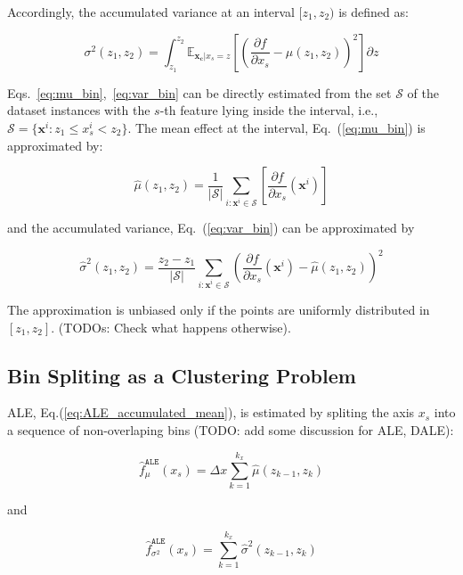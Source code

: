 \documentclass[twoside]{article}
\newcommand{\dfdx}{\frac{\partial f}{\partial x_s}}
\newcommand{\xc}{\mathbf{x_c}}
\begin{document}
\noindent
Accordingly, the accumulated variance at an interval \([z_1, z_2)\)
is defined as:

\begin{equation}
  \label{eq:var_bin}
  \sigma^2(z_1, z_2) = \int_{z_1}^{z_2}
  \mathbb{E}_{\xc|x_s=z} \left [ (\frac{\partial
      f}{\partial x_s} - \mu(z_1, z_2) )^2 \right] \partial z
\end{equation}

Eqs.~\eqref{eq:mu_bin},~\eqref{eq:var_bin} can be directly estimated
from the set \(\mathcal{S}\) of the dataset instances with the
\(s\)-th feature lying inside the interval, i.e.,
\( \mathcal{S}= \{ \mathbf{x}^i : z_1 \leq x^i_s < z_2 \} \). The mean
effect at the interval, Eq.~(\ref{eq:mu_bin}) is approximated by:

\begin{equation}
  \label{eq:mean_estimation}
  \hat{\mu}(z_1, z_2) = \frac{1}{|\mathcal{S}|} \sum_{i:\mathbf{x}^i \in
    \mathcal{S}} \left [ \dfdx(\mathbf{x}^i) \right ]
\end{equation}

and the accumulated variance, Eq.~(\ref{eq:var_bin}) can be
approximated by

\begin{equation}
  \label{eq:variance_estimation}
  \hat{\sigma}^2(z_1, z_2) = \frac{z_2 - z_1}{|\mathcal{S}|} \sum_{i:\mathbf{x}^i \in
    \mathcal{S}} \left ( \dfdx(\mathbf{x}^i) - \hat{\mu}(z_1, z_2) \right )^2
\end{equation}


The approximation is unbiased only if the points are uniformly
distributed in \([z_1, z_2]\). (TODOs: Check what happens
otherwise).

\subsection{Bin Spliting as a Clustering Problem}

ALE, Eq.(\ref{eq:ALE_accumulated_mean}), is estimated by spliting the
axis \(x_s\) into a sequence of non-overlaping bins (TODO: add some
discussion for ALE, DALE):

\begin{equation}
  \label{eq:ALE_accumulated_mean_est}
  \hat{f}^{\mathtt{ALE}}_{\mu}(x_s) = \Delta x \sum_{k=1}^{k_x} \hat{\mu}(z_{k-1}, z_k)
\end{equation}

and 

\begin{equation}
  \label{eq:ALE_accumulated_var_est}
  \hat{f}^{\mathtt{ALE}}_{\sigma^2}(x_s) = \sum_{k=1}^{k_x} \hat{\sigma}^2(z_{k-1}, z_k)
\end{equation}
\end{document}
